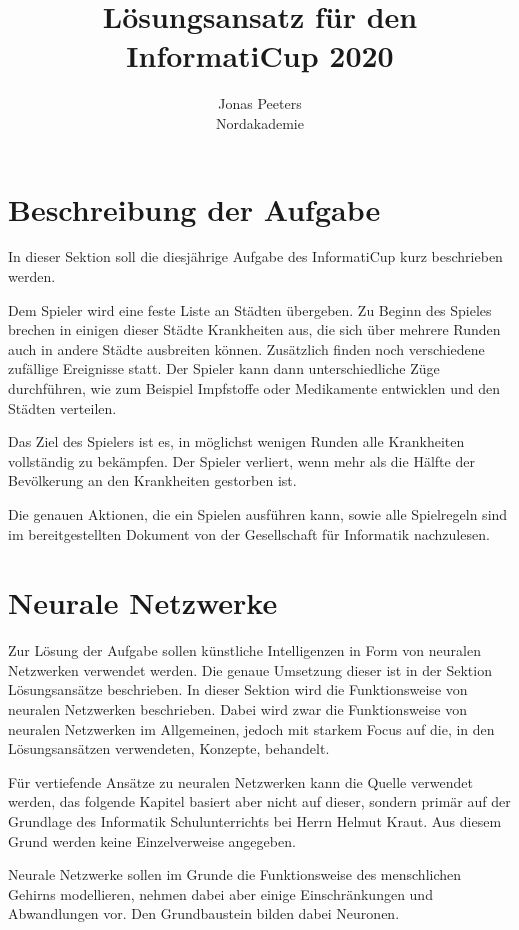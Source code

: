 \documentclass[11pt, twocolumn]{article}
\title{Lösungsansatz für den InformatiCup 2020}
\author{Jonas Peeters\\Nordakademie}
\begin{document}
\maketitle
\tableofcontents



\section{Beschreibung der Aufgabe}
In dieser Sektion soll die diesjährige Aufgabe des InformatiCup kurz beschrieben werden.

Dem Spieler wird eine feste Liste an Städten übergeben. Zu Beginn des Spieles brechen in einigen dieser Städte Krankheiten aus, die sich über mehrere Runden auch in andere Städte ausbreiten können. Zusätzlich finden noch verschiedene zufällige Ereignisse statt. Der Spieler kann dann unterschiedliche Züge durchführen, wie zum Beispiel Impfstoffe oder Medikamente entwicklen und den Städten verteilen.

Das Ziel des Spielers ist es, in möglichst wenigen Runden alle Krankheiten vollständig zu bekämpfen. Der Spieler verliert, wenn mehr als die Hälfte der Bevölkerung an den Krankheiten gestorben ist.

Die genauen Aktionen, die ein Spielen ausführen kann, sowie alle Spielregeln sind im bereitgestellten Dokument von der Gesellschaft für Informatik nachzulesen. 


\section{Neurale Netzwerke}
Zur Lösung der Aufgabe sollen künstliche Intelligenzen in Form von neuralen Netzwerken verwendet werden. Die genaue Umsetzung dieser ist in der Sektion Lösungsansätze beschrieben. In dieser Sektion wird die Funktionsweise von neuralen Netzwerken beschrieben. Dabei wird zwar die Funktionsweise von neuralen Netzwerken im Allgemeinen, jedoch mit starkem Focus auf die, in den Lösungsansätzen verwendeten, Konzepte, behandelt.

Für vertiefende Ansätze zu neuralen Netzwerken kann die Quelle \cite{Sarle94neuralnetworks} verwendet werden, das folgende Kapitel basiert aber nicht auf dieser, sondern primär auf der Grundlage des Informatik Schulunterrichts bei Herrn Helmut Kraut. \cite{kraut} Aus diesem Grund werden keine Einzelverweise angegeben.

Neurale Netzwerke sollen im Grunde die Funktionsweise des menschlichen Gehirns modellieren, nehmen dabei aber einige Einschränkungen und Abwandlungen vor. Den Grundbaustein bilden dabei Neuronen.
\end{document}
